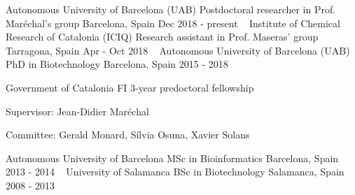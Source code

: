 


\begin{cventries}
  \cventry
    {Autonomous University of Barcelona (UAB)} %
    {Postdoctoral researcher in Prof. Maréchal's group} %
    {Barcelona, Spain} %
    {Dec 2018 - present} %
    {~}
  \cventry
    {Institute of Chemical Research of Catalonia (ICIQ)} %
    {Research assistant in Prof. Maseras' group} %
    {Tarragona, Spain} %
    {Apr - Oct 2018} %
    {~}
  \cventry
    {Autonomous University of Barcelona (UAB)} %
    {PhD in Biotechnology} %
    {Barcelona, Spain} %
    {2015 - 2018} %
    {
      \begin{cvitems} %
        \item {Government of Catalonia FI 3-year predoctoral fellowship}
        \item {Supervisor: Jean-Didier Maréchal}
        \item {Committee: Gerald Monard, Sílvia Osuna, Xavier Solans\\}
      \end{cvitems}
    }
  \cventry
    {Autonomous University of Barcelona} %
    {MSc in Bioinformatics} %
    {Barcelona, Spain} %
    {2013 - 2014} %
    {~}
  \cventry
    {University of Salamanca} %
    {BSc in Biotechnology} %
    {Salamanca, Spain} %
    {2008 - 2013} %
    {~}

\end{cventries}
